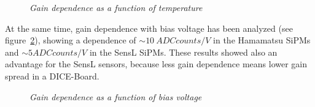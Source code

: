 \begin{figure}[h!]
  \centering
  \hspace{5mm}             
  \caption{\textit{Gain dependence as a function of temperature}}
  \label{fig:temp}
\end{figure}

At the same time, gain dependence with bias voltage has been analyzed (see figure~\ref{fig:bias}), showing a dependence of $\sim10~ADC counts/V$ in the Hamamatsu SiPMs and $\sim5ADC counts/V$ in the SensL SiPMs. These results showed also an advantage for the SensL sensors, because less gain dependence means lower gain spread in a DICE-Board.

\begin{figure}[h!]
  \centering
  \hspace{5mm}             
  \caption{\textit{Gain dependence as a function of bias voltage}}
  \label{fig:bias}
\end{figure}

